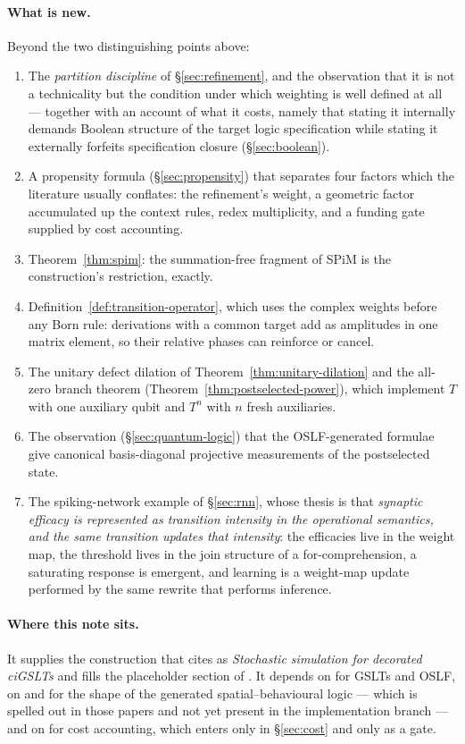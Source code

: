 \documentclass[11pt,a4paper]{article}
\theoremstyle{plain}
\theoremstyle{definition}
\theoremstyle{remark}
\begin{document}
\paragraph{What is new.} Beyond the two distinguishing points above:
\begin{enumerate}[label=(\roman*),leftmargin=2.2em]
\item The \emph{partition discipline} of \S\ref{sec:refinement}, and the observation that it is not
a technicality but the condition under which weighting is well defined at all --- together with an
account of what it costs, namely that stating it internally demands Boolean structure of the target
logic specification while stating it externally forfeits specification closure
(\S\ref{sec:boolean}).
\item A propensity formula (\S\ref{sec:propensity}) that separates four factors which the literature
usually conflates: the refinement's weight, a geometric factor accumulated up the context rules,
redex multiplicity, and a funding gate supplied by cost accounting.
\item Theorem~\ref{thm:spim}: the summation-free fragment of SPiM is the construction's restriction,
exactly.
\item Definition~\ref{def:transition-operator}, which uses the complex weights before any Born rule:
derivations with a common target add as amplitudes in one matrix element, so their relative phases
can reinforce or cancel.
\item The unitary defect dilation of Theorem~\ref{thm:unitary-dilation} and the all-zero branch theorem
(Theorem~\ref{thm:postselected-power}), which implement $T$ with one auxiliary qubit and $T^n$ with
$n$ fresh auxiliaries.
\item The observation (\S\ref{sec:quantum-logic}) that the OSLF-generated formulae give canonical
basis-diagonal projective measurements of the postselected state.
\item The spiking-network example of \S\ref{sec:rnn}, whose thesis is that \emph{synaptic efficacy is
represented as transition intensity in the operational semantics, and the same transition updates
that intensity}: the efficacies live in the weight map, the threshold lives in the join structure of
a for-comprehension, a saturating response is emergent, and learning is a weight-map update
performed by the same rewrite that performs inference.
\end{enumerate}

\paragraph{Where this note sits.} It supplies the construction that \cite{scientist} cites as
\emph{Stochastic simulation for decorated ciGSLTs} and fills the placeholder section of
\cite{mettacalc}. It depends on \cite{omnibus} for GSLTs and OSLF, on \cite{classifier} and
\cite{scientist} for the shape of the generated spatial--behavioural logic --- which is spelled out
in those papers and not yet present in the implementation branch --- and on \cite{costmonad} for
cost accounting, which enters only in \S\ref{sec:cost} and only as a gate.
\end{document}
